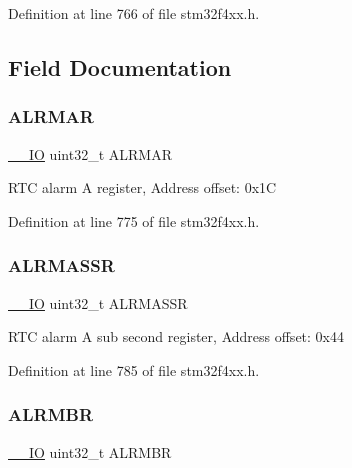 Definition at line 766 of file stm32f4xx.\+h.



\subsection{Field Documentation}
\mbox{\label{struct_r_t_c___type_def_ac005b1a5bc52634d5a34578cc9d2c3f6}} 
\subsubsection{\texorpdfstring{A\+L\+R\+M\+AR}{ALRMAR}}
{\footnotesize\ttfamily \hyperlink{group___c_m_s_i_s__core__definitions_gaec43007d9998a0a0e01faede4133d6be}{\+\_\+\+\_\+\+IO} uint32\+\_\+t A\+L\+R\+M\+AR}

R\+TC alarm A register, Address offset\+: 0x1C 

Definition at line 775 of file stm32f4xx.\+h.

\mbox{\label{struct_r_t_c___type_def_a61282fa74cede526af85fd9d20513646}} 
\subsubsection{\texorpdfstring{A\+L\+R\+M\+A\+S\+SR}{ALRMASSR}}
{\footnotesize\ttfamily \hyperlink{group___c_m_s_i_s__core__definitions_gaec43007d9998a0a0e01faede4133d6be}{\+\_\+\+\_\+\+IO} uint32\+\_\+t A\+L\+R\+M\+A\+S\+SR}

R\+TC alarm A sub second register, Address offset\+: 0x44 

Definition at line 785 of file stm32f4xx.\+h.

\mbox{\label{struct_r_t_c___type_def_a4e513deb9f58a138ad9f317cc5a3555d}} 
\subsubsection{\texorpdfstring{A\+L\+R\+M\+BR}{ALRMBR}}
{\footnotesize\ttfamily \hyperlink{group___c_m_s_i_s__core__definitions_gaec43007d9998a0a0e01faede4133d6be}{\+\_\+\+\_\+\+IO} uint32\+\_\+t A\+L\+R\+M\+BR}

